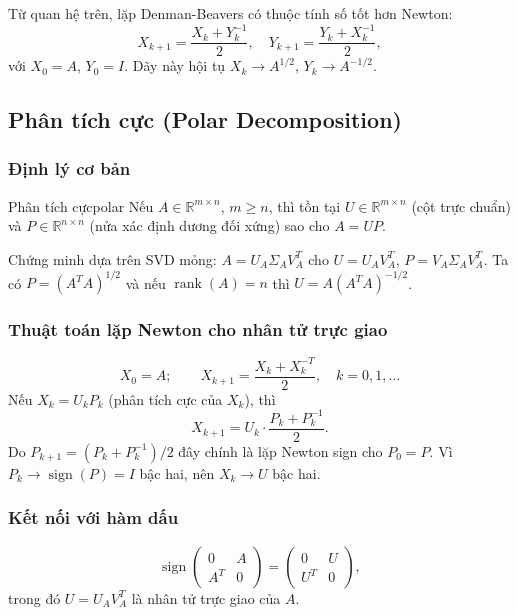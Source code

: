 \documentclass[12pt,a4paper]{report}
\newcommand{\R}{\mathbb{R}}
\newcommand{\sign}{\operatorname{sign}}
\DeclareMathOperator{\rank}{rank}
\begin{document}
Từ quan hệ trên, lặp Denman-Beavers có thuộc tính số tốt hơn Newton:
\[
  X_{k+1} = \frac{X_k + Y_k^{-1}}{2}, \quad
  Y_{k+1} = \frac{Y_k + X_k^{-1}}{2},
\]
với $X_0 = A$, $Y_0 = I$. Dãy này hội tụ $X_k \to A^{1/2}$, $Y_k \to A^{-1/2}$.

\subsection{Phân tích cực (Polar Decomposition)}

\subsubsection{Định lý cơ bản}

\begin{theorem}{Phân tích cực}{polar}
Nếu $A \in \R^{m \times n}$, $m \ge n$, thì tồn tại $U \in \R^{m \times n}$ (cột
trực chuẩn) và $P \in \R^{n \times n}$ (nửa xác định dương đối xứng) sao cho $A = UP$.
\end{theorem}

Chứng minh dựa trên SVD mỏng: $A = U_A \Sigma_A V_A^T$ cho $U = U_A V_A^T$,
$P = V_A \Sigma_A V_A^T$. Ta có $P = (A^T A)^{1/2}$ và nếu $\rank(A)=n$ thì
$U = A(A^T A)^{-1/2}$.

\subsubsection{Thuật toán lặp Newton cho nhân tử trực giao}

\[
  X_0 = A; \qquad X_{k+1} = \frac{X_k + X_k^{-T}}{2}, \quad k = 0, 1, \ldots
\]
Nếu $X_k = U_k P_k$ (phân tích cực của $X_k$), thì
\[
  X_{k+1} = U_k \cdot \frac{P_k + P_k^{-1}}{2}.
\]
Do $P_{k+1} = (P_k + P_k^{-1})/2$ đây chính là lặp Newton sign cho $P_0 = P$.
Vì $P_k \to \sign(P) = I$ bậc hai, nên $X_k \to U$ bậc hai.

\subsubsection{Kết nối với hàm dấu}

\[
  \sign\!\begin{pmatrix} 0 & A \\ A^T & 0 \end{pmatrix}
  = \begin{pmatrix} 0 & U \\ U^T & 0 \end{pmatrix},
\]
trong đó $U = U_A V_A^T$ là nhân tử trực giao của $A$.
\end{document}
